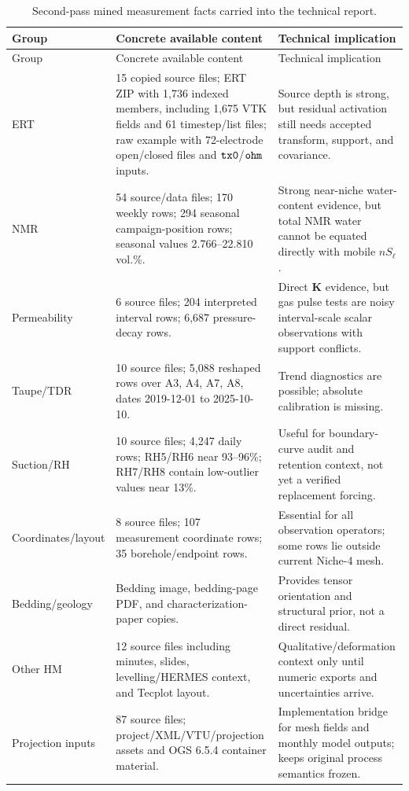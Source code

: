 \documentclass[10pt,a4paper]{article}
\newcommand{\code}[1]{\texttt{\detokenize{#1}}}
\newcommand{\K}{\bm K}
\begin{document}
\begin{longtable}{@{}L{0.18\textwidth}L{0.31\textwidth}Y@{}}
\caption{Second-pass mined measurement facts carried into the technical report.}\\
\toprule
Group & Concrete available content & Technical implication \\
\midrule
\endfirsthead
\toprule
Group & Concrete available content & Technical implication \\
\midrule
\endhead
\bottomrule
\endlastfoot
ERT & 15 copied source files; ERT ZIP with 1,736 indexed members, including 1,675 VTK fields and 61 timestep/list files; raw example with 72-electrode open/closed files and \(\code{tx0}\)/\(\code{ohm}\) inputs. & Source depth is strong, but residual activation still needs accepted transform, support, and covariance. \\
NMR & 54 source/data files; 170 weekly rows; 294 seasonal campaign-position rows; seasonal values 2.766--22.810 vol.\%. & Strong near-niche water-content evidence, but total NMR water cannot be equated directly with mobile \(nS_\ell\). \\
Permeability & 6 source files; 204 interpreted interval rows; 6,687 pressure-decay rows. & Direct \(\K\) evidence, but gas pulse tests are noisy interval-scale scalar observations with support conflicts. \\
Taupe/TDR & 10 source files; 5,088 reshaped rows over A3, A4, A7, A8, dates 2019-12-01 to 2025-10-10. & Trend diagnostics are possible; absolute calibration is missing. \\
Suction/RH & 10 source files; 4,247 daily rows; RH5/RH6 near 93--96\%; RH7/RH8 contain low-outlier values near 13\%. & Useful for boundary-curve audit and retention context, not yet a verified replacement forcing. \\
Coordinates/layout & 8 source files; 107 measurement coordinate rows; 35 borehole/endpoint rows. & Essential for all observation operators; some rows lie outside current Niche-4 mesh. \\
Bedding/geology & Bedding image, bedding-page PDF, and characterization-paper copies. & Provides tensor orientation and structural prior, not a direct residual. \\
Other HM & 12 source files including minutes, slides, levelling/HERMES context, and Tecplot layout. & Qualitative/deformation context only until numeric exports and uncertainties arrive. \\
Projection inputs & 87 source files; project/XML/VTU/projection assets and OGS 6.5.4 container material. & Implementation bridge for mesh fields and monthly model outputs; keeps original process semantics frozen. \\
\end{longtable}
\end{document}
